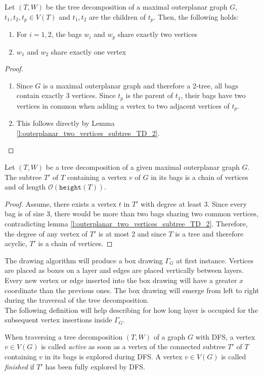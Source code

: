 \begin{lemma}\label{l:outerplanar_TD_properties}
	Let $(T,W)$ be the tree decomposition of a maximal outerplanar graph $G$, $t_1,t_2,t_p \in V(T)$ and $t_1, t_2$ are the children of $t_p$. Then, the following holds:
	\begin{enumerate}
		\item For $i = 1,2$, the bags $w_i$ and $w_p$ share exactly two vertices
		\item $w_1$ and $w_2$ share exactly one vertex
	\end{enumerate}
\end{lemma}
\begin{proof}
	\begin{enumerate}
		\item Since $G$ is a maximal outerplanar graph and therefore a 2-tree, all bags contain exactly 3 vertices. Since $t_p$ is the parent of $t_1$, their bags have two vertices in common when adding a vertex to two adjacent vertices of $t_p$.
		\item This follows directly by Lemma \ref{l:outerplanar_two_vertices_subtree_TD_2}.
	\end{enumerate}
\end{proof}

\begin{lemma}
	Let $(T,W)$ be a tree decomposition of a given maximal outerplanar graph $G$. The subtree $T'$ of $T$ containing a vertex $v$ of $G$ in its bags is a chain of vertices and of length $\mathcal{O}(\texttt{height}(T))$.\label{l:max_outerplanar_active_vertex_path}
\end{lemma}
\begin{proof}
	Assume, there exists a vertex $t$ in $T'$ with degree at least 3. Since every bag is of size 3, there would be more than two bags sharing two common vertices, contradicting lemma \ref{l:outerplanar_two_vertices_subtree_TD_2}. Therefore, the degree of any vertex of $T'$ is at most 2 and since $T$ is a tree and therefore acyclic, $T'$ is a chain of vertices.
\end{proof}
The drawing algorithm will produce a box drawing $\Gamma_{G}$ at first instance. Vertices are placed as boxes on a layer and edges are placed vertically between layers. Every new vertex or edge inserted into the box drawing will have a greater $x$ coordinate than the previous ones. The box drawing will emerge from left to right during the traversal of the tree decomposition.\\
The following definition will help describing for how long layer is occupied for the subsequent vertex insertions inside $\Gamma_{G}$.
\begin{definition}
	When traversing a tree decomposition $(T,W)$ of a graph $G$ with DFS, a vertex $v\in V(G)$ is called \emph{active} as soon as a vertex of the connected subtree $T'$ of $T$ containing $v$ in its bags is explored during DFS. A vertex $v\in V(G)$ is called \emph{finished} if $T'$ has been fully explored by DFS.
\end{definition}

